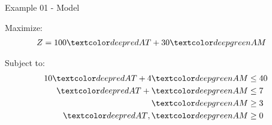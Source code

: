 \begin{frame}{Example 01 - Model}

Maximize:
\begin{align*}
    Z &= 100\colora{AT} + 30\colorb{AM}
\end{align*}

Subject to:
\begin{align*}
    10\colora{AT} + 4\colorb{AM} &\le 40 \\
      \colora{AT} +  \colorb{AM} &\le 7 \\
      \colorb{AM} &\ge 3 \\
      \colora{AT}, \colorb{AM} &\ge 0
\end{align*}
\end{frame}
